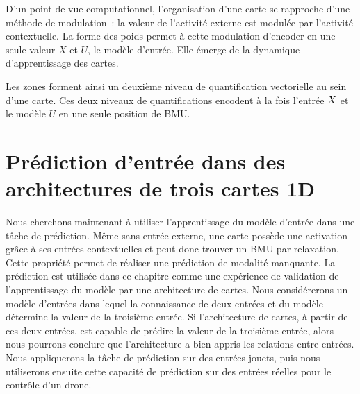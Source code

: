 \documentclass[../main]{subfiles}
\begin{document}
D'un point de vue computationnel, l'organisation d'une carte se rapproche d'une méthode de modulation~: la valeur de l'activité externe est modulée par l'activité contextuelle. 
La forme des poids permet à cette modulation d'encoder en une seule valeur $X$ et $U$, le modèle d'entrée. Elle émerge de la dynamique d'apprentissage des cartes.

Les zones forment ainsi un deuxième niveau de quantification vectorielle au sein d'une carte. 
Ces deux niveaux de quantifications encodent à la fois l'entrée $X$ et le modèle $U$ en une seule position de BMU.



\section{Prédiction d'entrée dans des architectures de trois cartes 1D}


Nous cherchons maintenant à utiliser l'apprentissage du modèle d'entrée dans une tâche de prédiction. Même sans entrée externe, une carte possède une activation grâce à ses entrées contextuelles et peut donc trouver un BMU par relaxation. Cette propriété permet de réaliser une prédiction de modalité manquante. 
La prédiction est utilisée dans ce chapitre comme une expérience de validation de l'apprentissage du modèle par une architecture de cartes.
Nous considérerons un modèle d'entrées dans lequel la connaissance de deux entrées et du modèle détermine la valeur de la troisième entrée. Si l'architecture de cartes, à partir de ces deux entrées, est capable de prédire la valeur de la troisième entrée, alors nous pourrons conclure que l'architecture a bien appris les relations entre entrées.
Nous appliquerons la tâche de prédiction sur des entrées jouets, puis nous utiliserons ensuite cette capacité de prédiction sur des entrées réelles pour le contrôle d'un drone.
\end{document}
